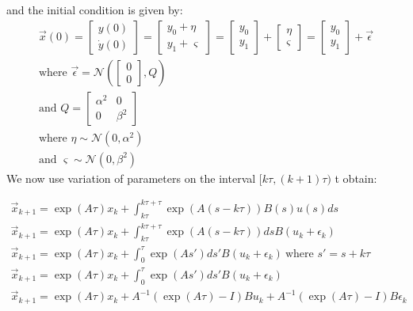 \documentclass[12pt]{article}
\begin{document}
and the initial condition is given by:
\begin{eqnarray*}
\vec{x}(0) = \begin{bmatrix} y(0) \\ \dot{y}(0) \end{bmatrix} = \begin{bmatrix} y_0 + \eta  \\ y_1 + \varsigma \end{bmatrix} = \begin{bmatrix} y_0 \\ y_1 \end{bmatrix} + \begin{bmatrix} \eta \\ \varsigma \end{bmatrix} = \begin{bmatrix} y_0 \\ y_1 \end{bmatrix} + \vec{\epsilon} \\
\text{where } \vec{\epsilon} = \mathcal{N}(\begin{bmatrix} 0 \\ 0 \end{bmatrix}, Q)\\
\text{and } Q = \begin{bmatrix} \alpha^2 & 0 \\ 0 & \beta^2 \end{bmatrix} \\
\text{where } \eta \sim \mathcal{N}(0, \alpha^2) \\
\text{and } \varsigma \sim \mathcal{N}(0, \beta^2)
\end{eqnarray*}
We now use variation of parameters on the interval $[k\tau, (k+1)\tau)$ t obtain:

\begin{eqnarray*}
\vec{x}_{k+1} = \exp(A\tau)x_{k} + \int_{k\tau}^{k\tau+\tau} \exp(A(s-k\tau)) B(s) u(s) ds\\
\vec{x}_{k+1} = \exp(A\tau)x_{k} + \int_{k\tau}^{k\tau+\tau} \exp(A(s-k\tau)) ds B(u_k + \epsilon_k) \\
\vec{x}_{k+1} = \exp(A\tau)x_{k} + \int_{0}^{\tau} \exp(As') ds' B(u_k + \epsilon_k) \ \text{where } s'=s+k\tau \\
\vec{x}_{k+1} = \exp(A\tau)x_{k} + \int_{0}^{\tau} \exp(As') ds' B(u_k + \epsilon_k) \\
\vec{x}_{k+1} = \exp(A\tau)x_{k} + A^{-1}(\exp(A\tau)-I)Bu_k + A^{-1}(\exp(A\tau)-I)B\epsilon_k  \\
\end{eqnarray*}
\end{document}
